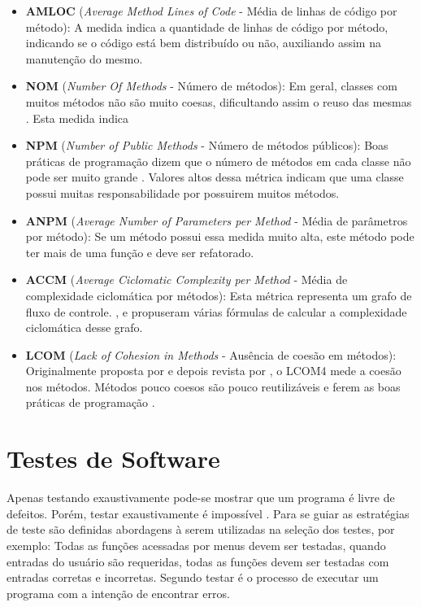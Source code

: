 \begin{itemize}
\item \textbf{AMLOC }(\textit{Average Method Lines of Code} - Média de linhas de código por método): A medida indica a quantidade de linhas de código por método, indicando se o código está bem distribuído ou não, auxiliando assim na manutenção do mesmo.
\item \textbf{NOM }(\textit{Number Of Methods} - Número de métodos): Em geral, classes com muitos métodos não são muito coesas, dificultando assim o reuso das mesmas \cite{lorenzkidd}. Esta medida indica
\item \textbf{NPM }(\textit{Number of Public Methods} - Número de métodos públicos): Boas práticas de programação dizem que o número de métodos em cada classe não pode ser muito grande \cite{beck}. Valores altos dessa métrica indicam que uma classe possui muitas responsabilidade por possuirem muitos métodos.
\item \textbf{ANPM }(\textit{Average Number of Parameters per Method} - Média de parâmetros por método): Se um método possui essa medida muito alta, este método pode ter mais de uma função e deve ser refatorado.
\item \textbf{ACCM }(\textit{Average Ciclomatic Complexity per Method} - Média de complexidade ciclomática por métodos): Esta métrica representa um grafo de fluxo de controle. ,  e  propuseram várias fórmulas de calcular a complexidade ciclomática desse grafo.
\item \textbf{LCOM }(\textit{Lack of Cohesion in Methods} - Ausência de coesão em métodos): Originalmente proposta por  e depois revista por , o LCOM4 mede a coesão nos métodos. Métodos pouco coesos são pouco reutilizáveis e ferem as boas práticas de programação \cite{beck}.
\end{itemize}

\section{Testes de Software}

Apenas testando exaustivamente pode-se mostrar que um programa é livre de defeitos. Porém, testar exaustivamente é impossível . Para se guiar as estratégias de teste são definidas abordagens à serem utilizadas na seleção dos testes, por exemplo: Todas as funções acessadas por menus devem ser testadas, quando entradas do usuário são requeridas, todas as funções devem ser testadas com entradas corretas e incorretas. Segundo  testar é o processo de executar um programa com a intenção de encontrar erros.
